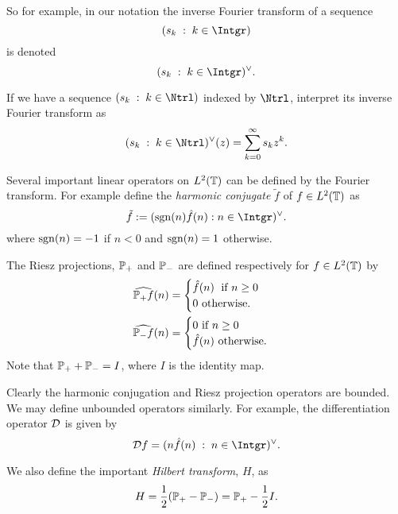 \documentclass{unswmaths}
\begin{document}
So for example, in our notation the inverse Fourier transform of a sequence
\begin{equation*}
    (s_k\;:\;k \in \Intgr)
\end{equation*}
is denoted
\begin{equation*}
    (s_k\;:\;k \in \Intgr)^\vee.
\end{equation*}

If we have a sequence $(s_k\;:\;k \in \Ntrl)$ indexed by $\Ntrl$, interpret its
inverse Fourier transform as
\begin{equation*}
    (s_k\;:\;k \in \Ntrl)^\vee(z) = \sum_{k=0}^\infty s_kz^k.
\end{equation*}

Several important linear operators on $L^2(\mathbb{T})$ can be defined by the Fourier
transform. For example define the \emph{harmonic conjugate} $\tilde{f}$ of $f \in L^2(\mathbb{T})$ as
\begin{equation*}
    \tilde{f} := (\sgn(n)\hat{f}(n):n \in \Intgr)^{\vee}.
\end{equation*}
where $\operatorname{sgn}(n) = -1$ if $n < 0$ and $\operatorname{sgn}(n) = 1$ otherwise.


The Riesz projections, $\mathbb{P}_+$ and $\mathbb{P}_-$ are defined respectively for $f \in L^2(\mathbb{T})$ by
\begin{align*}
        \widehat{\mathbb{P}_+ f}(n) &= \begin{cases} \hat{f}(n)\;\text{ if }n \geq 0\\
        0\text{ otherwise.}\\
   \end{cases}\\
   \widehat{\mathbb{P}_- f}(n) &= \begin{cases} 0\text{ if }n \geq 0\\
        \hat{f}(n)\text{ otherwise.}\\
   \end{cases}
\end{align*}
Note that $\mathbb{P}_++\mathbb{P}_- = I$, where $I$ is the identity map.

Clearly the harmonic conjugation and Riesz projection operators are bounded. We may
define unbounded operators similarly. For example, the differentiation operator $\mathcal{D}$ is given by
\begin{equation*}
    \Diff f = (n\hat{f}(n)\;:\;n \in \Intgr)^\vee.
\end{equation*}

We also define the important \emph{Hilbert transform}, $H$, as
\begin{equation*}
    H = \frac{1}{2}(\mathbb{P}_+-\mathbb{P}_-) = \mathbb{P}_+-\frac{1}{2}I.
\end{equation*}
\end{document}
